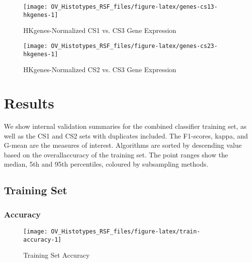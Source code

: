 \documentclass[
]{report}
\begin{document}
\begin{figure}[H]

{\centering \texttt{[image: OV\_Histotypes\_RSF\_files/figure-latex/genes-cs13-hkgenes-1]} 

}

\caption{HKgenes-Normalized CS1 vs. CS3 Gene Expression}\label{fig:genes-cs13-hkgenes}
\end{figure}

\begin{figure}[H]

{\centering \texttt{[image: OV\_Histotypes\_RSF\_files/figure-latex/genes-cs23-hkgenes-1]} 

}

\caption{HKgenes-Normalized CS2 vs. CS3 Gene Expression}\label{fig:genes-cs23-hkgenes}
\end{figure}

\hypertarget{results}{%
\chapter{Results}\label{results}}

We show internal validation summaries for the combined classifier training set, as well as the CS1 and CS2 sets with duplicates included. The F1-scores, kappa, and G-mean are the measures of interest. Algorithms are sorted by descending value based on the overallaccuracy of the training set. The point ranges show the median, 5th and 95th percentiles, coloured by subsampling methods.

\hypertarget{training-set}{%
\section{Training Set}\label{training-set}}

\hypertarget{accuracy}{%
\subsection{Accuracy}\label{accuracy}}

\begin{figure}[H]

{\centering \texttt{[image: OV\_Histotypes\_RSF\_files/figure-latex/train-accuracy-1]} 

}

\caption{Training Set Accuracy}\label{fig:train-accuracy}
\end{figure}
\end{document}
